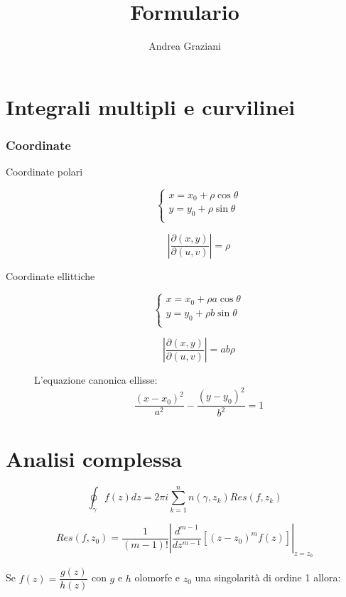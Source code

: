 \documentclass[10pt,a4paper]{article}
\author{Andrea Graziani}
\title{Formulario}
\begin{document}
\section{Integrali multipli e curvilinei}

\subsubsection{Coordinate}

\begin{description}
\item[Coordinate polari]

\[
\begin{cases}
x = x_0 + \rho \cos \theta \\
y = y_0 + \rho \sin \theta \\
\end{cases}
\]

\[ \left| \dfrac{\partial(x,y)}{\partial(u,v)} \right| = \rho \]

\item[Coordinate ellittiche]

\[
\begin{cases}
x = x_0 + \rho a\cos \theta \\
y = y_0 + \rho b\sin \theta \\
\end{cases}
\]

\[ \left| \dfrac{\partial(x,y)}{\partial(u,v)} \right| = ab\rho \]

L'equazione canonica ellisse:
\[
\dfrac{(x-x_0)^{2}}{a^2} - \dfrac{(y-y_0)^{2}}{b^2} = 1
\]

\end{description}

\section{Analisi complessa}

\begin{equation}
\oint_\gamma f(z)dz = 2\pi i \sum_{k = 1}^{n} n(\gamma, z_{k})Res(f, z_{k})
\end{equation}


\begin{equation}
Res(f, z_{0}) = \dfrac{1}{(m-1)!} \left| \dfrac{d^{m-1}}{dz^{m-1}}\left[ (z-z_{0})^{m}f(z) \right]  \right|_{z=z_{0}}
\end{equation}

Se $f(z)=\dfrac{g(z)}{h(z)}$ con $g$ e $h$ olomorfe e $z_0$ una singolarità di ordine 1 allora:
\end{document}
